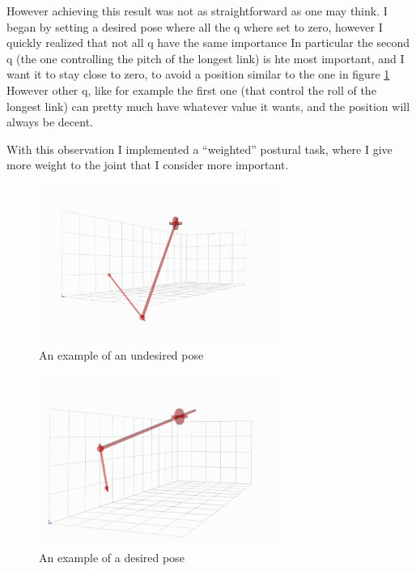\documentclass[12pt,a4paper]{article}
\begin{document}
However achieving this result was not as straightforward as one may think. I began by setting a desired
pose where all the q where set to zero, however I quickly realized that not all q have the same importance
In particular the second q (the one controlling the pitch of the longest link) is hte most important, and 
I want it to stay close to zero, to avoid a position similar to the one in figure \ref{fig:undesired_pose}
However other q, like for example the first one (that control the roll of the longest link)
can pretty much have whatever value it wants, and the position will always be decent.

With this observation I implemented a ``weighted'' postural task, where I give more weight
to the joint that I consider more important.

\begin{figure}[H]
    \centering
    \includegraphics[width=0.7\textwidth]{images/final_position_low.png}
    \caption{An example of an undesired pose}
    \label{fig:undesired_pose}
\end{figure}


\begin{figure}[H]
    \centering
    \includegraphics[width=0.7\textwidth]{images/final_positino_high.png}
    \caption{An example of a desired pose}
    \label{fig:desired_pose}
\end{figure}
\end{document}
